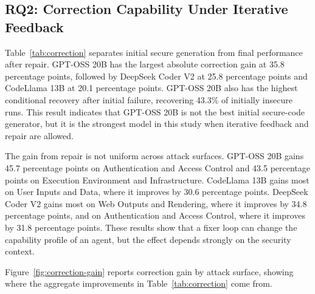 \documentclass[11pt]{article}
\newcommand{\pp}{percentage points}
\begin{document}
\FloatBarrier
\subsection{RQ2: Correction Capability Under Iterative Feedback}

Table~\ref{tab:correction} separates initial secure generation from final performance after repair. GPT-OSS 20B has the largest absolute correction gain at 35.8 \pp{}, followed by DeepSeek Coder V2 at 25.8 \pp{} and CodeLlama 13B at 20.1 \pp{}. GPT-OSS 20B also has the highest conditional recovery after initial failure, recovering 43.3\% of initially insecure runs. This result indicates that GPT-OSS 20B is not the best initial secure-code generator, but it is the strongest model in this study when iterative feedback and repair are allowed.

\begin{table}[t]
\centering
\caption{Correction capability under iterative feedback.}
\label{tab:correction}
\end{table}

The gain from repair is not uniform across attack surfaces. GPT-OSS 20B gains 45.7 \pp{} on Authentication and Access Control and 43.5 \pp{} on Execution Environment and Infrastructure. CodeLlama 13B gains most on User Inputs and Data, where it improves by 30.6 \pp{}. DeepSeek Coder V2 gains most on Web Outputs and Rendering, where it improves by 34.8 \pp{}, and on Authentication and Access Control, where it improves by 31.8 \pp{}. These results show that a fixer loop can change the capability profile of an agent, but the effect depends strongly on the security context.

Figure~\ref{fig:correction-gain} reports correction gain by attack surface, showing where the aggregate improvements in Table~\ref{tab:correction} come from.
\end{document}
